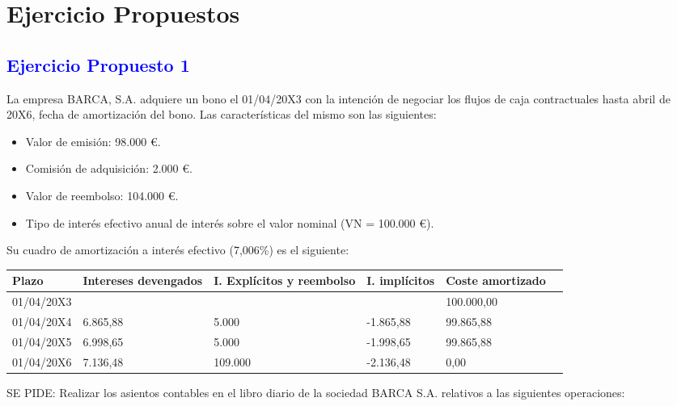 \section{Ejercicio Propuestos}
\subsection*{\textcolor{blue}{Ejercicio Propuesto 1}}


La empresa BARCA, S.A. adquiere un bono el 01/04/20X3 con la intención de negociar los flujos de caja contractuales hasta abril de 20X6, fecha de amortización del bono. Las características del mismo son las siguientes:
\begin{itemize}
    \item Valor de emisión: 98.000 €.
    \item Comisión de adquisición: 2.000 €.
    \item Valor de reembolso: 104.000 €.
    \item Tipo de interés efectivo anual de interés sobre el valor nominal (VN = 100.000 €).
\end{itemize}

Su cuadro de amortización a interés efectivo (7,006\%) es el siguiente:
\begin{table}
\centering
\begin{tabular}{|p{2cm}|p{2cm}|p{2cm}|p{2cm}|p{2cm}|p{2cm}}
    \hline
    Plazo & Intereses devengados & I. Explícitos y reembolso & I. implícitos & Coste amortizado \\
    \hline
    01/04/20X3 & & & & 100.000,00 \\
    \hline
    01/04/20X4 & 6.865,88 & 5.000 & -1.865,88 & 99.865,88 \\
    \hline
    01/04/20X5 & 6.998,65 & 5.000 & -1.998,65 & 99.865,88 \\
    \hline
    01/04/20X6 & 7.136,48 & 109.000 & -2.136,48 & 0,00 \\
    \hline
    \end{tabular}
\end{table}


SE PIDE: Realizar los asientos contables en el libro diario de la sociedad BARCA S.A. relativos a las siguientes operaciones:

